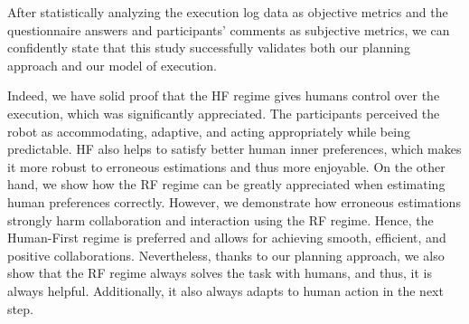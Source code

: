 After statistically analyzing the execution log data as objective metrics and the questionnaire answers and participants' comments as subjective metrics, we can confidently state that this study successfully validates both our planning approach and our model of execution. 

Indeed, we have solid proof that the  HF regime gives humans control over the execution, which was significantly appreciated. The participants perceived the robot as accommodating, adaptive, and acting appropriately while being predictable. HF also helps to satisfy better human inner preferences, which makes it more robust to erroneous estimations and thus more enjoyable. 
On the other hand, we show how the RF regime can be greatly appreciated when estimating human preferences correctly. However, we demonstrate how erroneous estimations strongly harm collaboration and interaction using the RF regime. 
Hence, the Human-First regime is preferred and allows for achieving smooth, efficient, and positive collaborations.
Nevertheless, thanks to our planning approach, we also show that the RF regime always solves the task with humans, and thus, it is always helpful. Additionally, it also always adapts to human action in the next step. 

